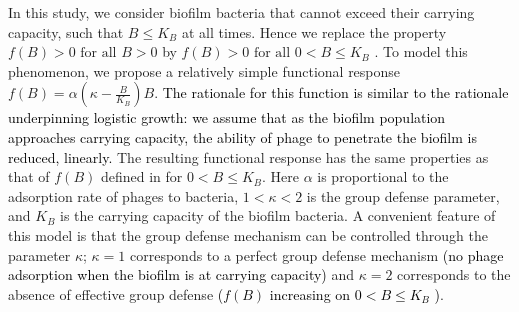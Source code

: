 In this study, we consider biofilm bacteria that cannot exceed their carrying capacity, such that $B \leq K_{B}$ at all times. Hence  we replace the property 
$f(B)>0 \,\, \text{for all} \,\,B>0$ by 
$f(B)>0 \,\, \text{for all} \,\,0<B\le K_{B}$ . 
 To model this phenomenon, we propose a relatively simple functional response 
 $f(B)=\alpha\left(\kappa-\frac{B}{K_{B}}\right)B.$
\textcolor{black}{The rationale for this function is similar to the rationale underpinning logistic growth: we assume that as the biofilm population
 approaches carrying capacity, the ability of phage to
 penetrate the biofilm is reduced, linearly.} The resulting functional response has the same properties as that of $f(B)$ defined in \citep{zhu_bifurcation_2002,xiao_global_2001} for $0<B \leq K_{B}$. 
 Here $\alpha$ is proportional to the adsorption rate of phages to bacteria, $1<\kappa<2$ is the group defense parameter, and $K_{B}$ is the carrying capacity of the biofilm bacteria. A convenient feature of this model is that the group defense mechanism can be controlled through the parameter $\kappa$; $\kappa=1$ corresponds to a perfect group defense mechanism \textcolor{black}{(no phage adsorption when the biofilm is at carrying capacity)} and $\kappa=2$ corresponds to the absence of effective group defense \textcolor{black}{($f(B)$ increasing on $0<B\le K_B$ )}.\\  

